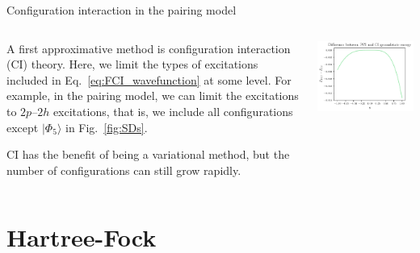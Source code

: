 \documentclass[UKenglish,aspectratio=169]{beamer}
\begin{document}
\begin{frame}{Configuration interaction in the pairing model}
    \begin{columns}
        \begin{column}{.49\textwidth}
            A first approximative method is configuration interaction (CI) theory.
            Here, we limit the types of excitations included in Eq.~\eqref{eq:FCI_wavefunction} at some level.
            For example, in the pairing model, we can limit the excitations to $2p$--$2h$ excitations, that is, we include all configurations except $\vert \Phi_5 \rangle$ in Fig.~\ref{fig:SDs}.

            \medskip

            CI has the benefit of being a variational method, but the number of configurations can still grow rapidly.
        \end{column}

        \begin{column}{.49\textwidth}
            \includegraphics[width=\textwidth]{../midterm2/figures/c_groundstate_energy_diff.pdf}
        \end{column}
    \end{columns}

\end{frame}

\section{Hartree-Fock}
\end{document}
